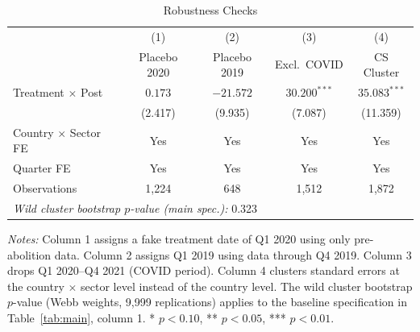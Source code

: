 
\begin{table}[H]
\centering
\caption{Robustness Checks}
\label{tab:robust}
\begin{threeparttable}
\begin{tabular}{lcccc}
\toprule
 & (1) & (2) & (3) & (4) \\
 & {Placebo 2020} & {Placebo 2019} & {Excl.\ COVID} & {CS Cluster} \\
\midrule
Treatment $\times$ Post & $0.173$ & $-21.572$ & $30.200^{***}$ & $35.083^{***}$ \\
 & (2.417) & (9.935) & (7.087) & (11.359) \\
\midrule
Country $\times$ Sector FE & Yes & Yes & Yes & Yes \\
Quarter FE & Yes & Yes & Yes & Yes \\
Observations & 1,224 & 648 & 1,512 & 1,872 \\
\midrule
\multicolumn{5}{l}{\textit{Wild cluster bootstrap $p$-value (main spec.):} 0.323} \\
\bottomrule
\end{tabular}
\begin{tablenotes}[flushleft]
\small
\item \textit{Notes:} Column 1 assigns a fake treatment date of Q1 2020 using only pre-abolition data. Column 2 assigns Q1 2019 using data through Q4 2019. Column 3 drops Q1 2020--Q4 2021 (COVID period). Column 4 clusters standard errors at the country $\times$ sector level instead of the country level. The wild cluster bootstrap $p$-value (Webb weights, 9{,}999 replications) applies to the baseline specification in Table~\ref{tab:main}, column 1. * $p<0.10$, ** $p<0.05$, *** $p<0.01$.
\end{tablenotes}
\end{threeparttable}
\end{table}

